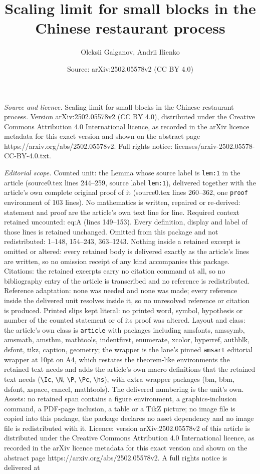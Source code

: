 \documentclass[10pt,a4paper]{amsart}
\title[Scaling limit for small blocks in the Chinese restaurant pro]{Scaling limit for small blocks in the Chinese restaurant process}
\author{Oleksii Galganov, Andrii Ilienko}
\date{Source: arXiv:2502.05578v2 (CC BY 4.0)}
\begin{document}
\maketitle

\noindent\emph{Source and licence.} Scaling limit for small blocks in the Chinese restaurant process. Version arXiv:2502.05578v2 (CC BY 4.0), distributed under the Creative Commons Attribution 4.0 International licence, as recorded in the arXiv licence metadata for this exact version and shown on the abstract page https://arxiv.org/abs/2502.05578v2. Full rights notice: licenses/arxiv-2502.05578-CC-BY-4.0.txt.\par\smallskip

\noindent\textit{Editorial scope.} Counted unit: the Lemma whose source label is \texttt{lem:1} in the article (source0.tex lines 244--259, source label \texttt{lem:1}), delivered together with the article's own complete original proof of it (source0.tex lines 260--362, one \texttt{proof} environment of 103 lines). No mathematics is written, repaired or re-derived: statement and proof are the article's own text line for line. Required context retained uncounted: eq:A (lines 149--153). Every definition, display and label of those lines is retained unchanged. Omitted from this package and not redistributed: 1--148, 154--243, 363--1243. Nothing inside a retained excerpt is omitted or altered: every retained body is delivered exactly as the article's lines are written, so no omission receipt of any kind accompanies this package. Citations: the retained excerpts carry no citation command at all, so no bibliography entry of the article is transcribed and no reference is redistributed. Reference adaptation: none was needed and none was made; every reference inside the delivered unit resolves inside it, so no unresolved reference or citation is produced. Printed slips kept literal: no printed word, symbol, hypothesis or number of the counted statement or of its proof was altered. Layout and class: the article's own class is \texttt{article} with packages including amsfonts, amssymb, amsmath, amsthm, mathtools, indentfirst, enumerate, xcolor, hyperref, authblk, dsfont, tikz, caption, geometry; the wrapper is the lane's pinned \texttt{amsart} editorial wrapper at 10pt on A4, which restates the theorem-like environments the retained text needs and adds the article's own macro definitions that the retained text needs (\texttt{\textbackslash Ic}, \texttt{\textbackslash N}, \texttt{\textbackslash P}, \texttt{\textbackslash Pc}, \texttt{\textbackslash hs}), with extra wrapper packages (bm, bbm, dsfont, xspace, cancel, mathtools). The delivered numbering is the unit's own. Assets: no retained span contains a figure environment, a graphics-inclusion command, a PDF-page inclusion, a table or a TikZ picture; no image file is copied into this package, the package declares no asset dependency and no image file is redistributed with it. Licence: version arXiv:2502.05578v2 of this article is distributed under the Creative Commons Attribution 4.0 International licence, as recorded in the arXiv licence metadata for this exact version and shown on the abstract page https://arxiv.org/abs/2502.05578v2. A full rights notice is delivered at 
\end{document}
